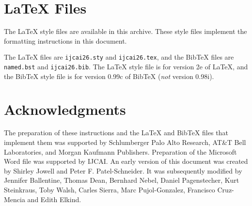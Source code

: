 \documentclass{article}
\begin{document}
\section{\LaTeX{} Files}\label{stylefiles}

The \LaTeX{} style files are available in this archive.
These style files implement the formatting instructions in this
document.

The \LaTeX{} files are {\tt ijcai26.sty} and {\tt ijcai26.tex}, and
the Bib\TeX{} files are {\tt named.bst} and {\tt ijcai26.bib}. The
\LaTeX{} style file is for version 2e of \LaTeX{}, and the Bib\TeX{}
style file is for version 0.99c of Bib\TeX{} ({\em not} version
0.98i). 




\appendix



\section*{Acknowledgments}

The preparation of these instructions and the \LaTeX{} and Bib\TeX{}
files that implement them was supported by Schlumberger Palo Alto
Research, AT\&T Bell Laboratories, and Morgan Kaufmann Publishers.
Preparation of the Microsoft Word file was supported by IJCAI.  An
early version of this document was created by Shirley Jowell and Peter
F. Patel-Schneider.  It was subsequently modified by Jennifer
Ballentine, Thomas Dean, Bernhard Nebel, Daniel Pagenstecher,
Kurt Steinkraus, Toby Walsh, Carles Sierra, Marc Pujol-Gonzalez,
Francisco Cruz-Mencia and Edith Elkind.




\end{document}
